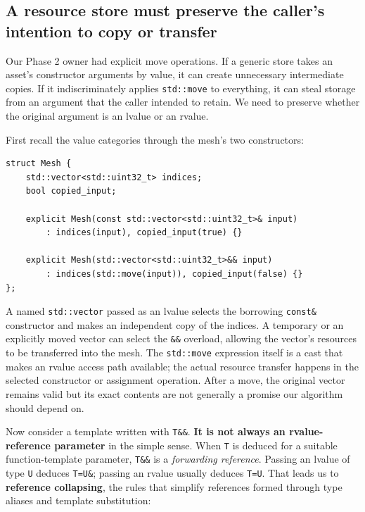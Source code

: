 \subsection{A resource store must preserve the caller's intention to copy or transfer}\label{01-foundations-i-ch005-a-resource-store-must-preserve-the-callers-intention-to-copy-or-transfer}

Our Phase 2 owner had explicit move operations. If a generic store takes an asset's constructor arguments by value, it can create unnecessary intermediate copies. If it indiscriminately applies \texttt{std::move} to everything, it can steal storage from an argument that the caller intended to retain. We need to preserve whether the original argument is an lvalue or an rvalue.

First recall the value categories through the mesh's two constructors:

\begin{verbatim}
struct Mesh {
    std::vector<std::uint32_t> indices;
    bool copied_input;

    explicit Mesh(const std::vector<std::uint32_t>& input)
        : indices(input), copied_input(true) {}

    explicit Mesh(std::vector<std::uint32_t>&& input)
        : indices(std::move(input)), copied_input(false) {}
};
\end{verbatim}

A named \texttt{std::vector} passed as an lvalue selects the borrowing \texttt{const\&} constructor and makes an independent copy of the indices. A temporary or an explicitly moved vector can select the \texttt{\&\&} overload, allowing the vector's resources to be transferred into the mesh. The \texttt{std::move} expression itself is a cast that makes an rvalue access path available; the actual resource transfer happens in the selected constructor or assignment operation. After a move, the original vector remains valid but its exact contents are not generally a promise our algorithm should depend on.

Now consider a template written with \texttt{T\&\&}. \textbf{It is not always an rvalue-reference parameter} in the simple sense. When \texttt{T} is deduced for a suitable function-template parameter, \texttt{T\&\&} is a \emph{forwarding reference}. Passing an lvalue of type \texttt{U} deduces \texttt{T=U\&}; passing an rvalue usually deduces \texttt{T=U}. That leads us to \textbf{reference collapsing}, the rules that simplify references formed through type aliases and template substitution:

